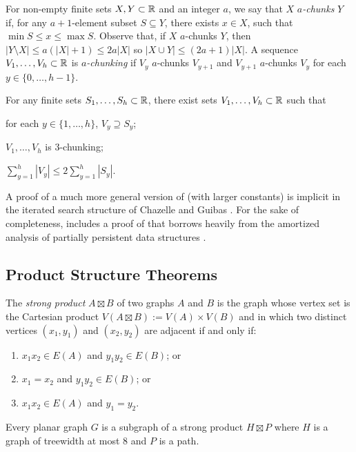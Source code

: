 \documentclass[kpfonts]{patmorin}
\let\le\leqslant
\begin{document}
For non-empty finite sets $X,Y\subset \mathbb{R}$ and an integer $a$, we say that $X$ \emph{$a$-chunks} $Y$ if, for any $a+1$-element subset $S\subseteq Y$, there exists $x\in X$, such that $\min S\le x\le \max S$. Observe that, if $X$ $a$-chunks $Y$, then $|Y\setminus X|\le a(|X|+1)\le 2a|X|$ so $|X\cup Y|\le (2a+1)|X|$.  A sequence $V_1,\dots,V_h\subset\mathbb{R}$ is \emph{$a$-chunking} if $V_y$ $a$-chunks $V_{y+1}$ and $V_{y+1}$ $a$-chunks $V_y$ for each $y\in\{0,\dots,h-1\}$.

\begin{lem}
  For any finite sets $S_1,\dots,S_h\subset\mathbb{R}$, there exist sets $V_1,\dots,V_{h}\subset\mathbb{R}$ such that
  \begin{compactenum}
    \item for each $y\in\{1,\dots,h\}$, $V_y\supseteq S_y$;
    \item $V_1,\dots,V_h$ is $3$-chunking;
    \item $\sum_{y=1}^h |V_y|\le 2\sum_{y=1}^h |S_y|$.
  \end{compactenum}
\end{lem}

A proof of a much more general version of  (with larger constants) is implicit in the iterated search structure of Chazelle and Guibas \cite{chazelle.guibas:fractional1}.   For the sake of completeness,  includes a proof of  that borrows heavily from the amortized analysis of partially persistent data structures \cite[Section~2.3]{driscoll.sarnak.ea:making}.


\subsection{Product Structure Theorems}

The \emph{strong product} $A\boxtimes B$ of two graphs $A$ and $B$ is the graph whose vertex set is the Cartesian product $V(A\boxtimes B):=V(A)\times V(B)$ and in which two distinct vertices $(x_1,y_1)$ and $(x_2,y_2)$ are adjacent if and only if:
\begin{enumerate}
  \item  $x_1x_2 \in E(A)$ and $y_1y_2 \in E(B)$; or
  \item $x_1=x_2$ and $y_1y_2\in E(B)$; or
  \item $x_1x_2 \in E(A)$ and $y_1=y_2$.
\end{enumerate}

\begin{thm}
  Every planar graph $G$ is a subgraph of a strong product $H\boxtimes P$ where $H$ is a graph of treewidth at most 8 and $P$ is a path.
\end{thm}
\end{document}
